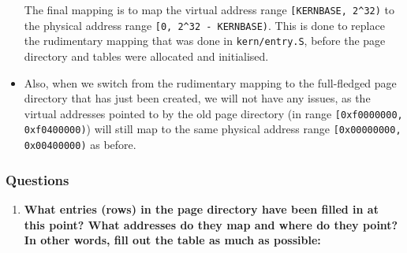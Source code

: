 \documentclass[]{article}
\begin{document}
\begin{itemize}
  The final mapping is to map the virtual address range
  \texttt{{[}KERNBASE, 2\^{}32)} to the physical address range
  \texttt{{[}0, 2\^{}32 - KERNBASE)}. This is done to replace the
  rudimentary mapping that was done in \texttt{kern/entry.S}, before the
  page directory and tables were allocated and initialised.
\item
  Also, when we switch from the rudimentary mapping to the full-fledged
  page directory that has just been created, we will not have any
  issues, as the virtual addresses pointed to by the old page directory
  (in range \texttt{{[}0xf0000000, 0xf0400000)}) will still map to the
  same physical address range \texttt{{[}0x00000000, 0x00400000)} as
  before.
\end{itemize}

\subsubsection{Questions}

\begin{enumerate}
\def\labelenumi{\arabic{enumi}.}
\setcounter{enumi}{1}
\itemsep1pt\parskip0pt
\item
  \textbf{What entries (rows) in the page directory have been filled in
  at this point? What addresses do they map and where do they point? In
  other words, fill out the table as much as possible:}
\end{enumerate}
\end{document}
